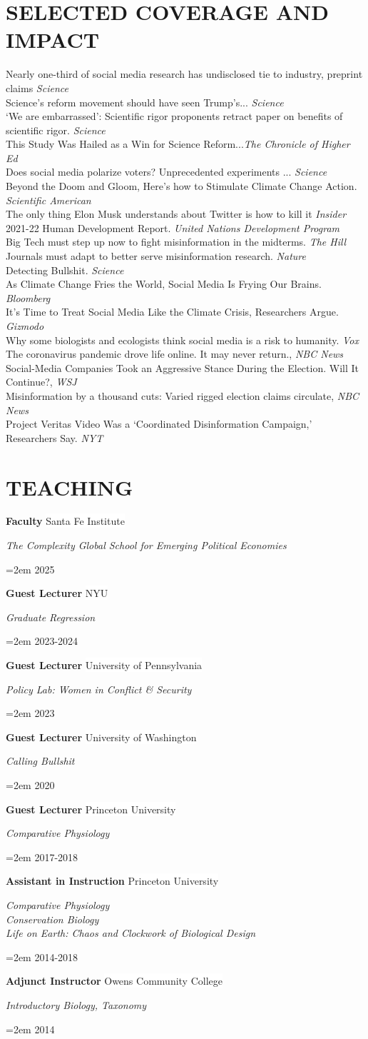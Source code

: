 \documentclass[paper=a4,fontsize=11pt]{scrartcl}
\newcommand{\NewPart}[1]{\section*{\uppercase{#1}}}
\newcommand{\EducationEntry}[4]{
		\noindent \textbf{#1} \hfill 					%
		\colorbox{White}{%
			\parbox{10em}{%
			\hfill\color{Black}#2}} \par				%
		\noindent \textit{#3} \par					%
		\noindent\hangindent=2em\hangafter=0 \small #4 	%
		\normalsize \par}
\newcommand{\WorkEntry}[4]{						%
		\noindent \textbf{#1} \hfill 					%
		\colorbox{White}{\color{Black}#2} \par		%
		\noindent \textit{#3} \par					%
		\noindent\hangindent=2em\hangafter=0 \small #4 	%
		\normalsize \par}
\begin{document}
\NewPart{Selected Coverage and Impact}{}
Nearly one-third of social media research has undisclosed tie to industry, preprint claims \textit{Science}\\
Science’s reform movement should have seen Trump’s... \textit{Science}\\
‘We are embarrassed’: Scientific rigor proponents retract paper on benefits of scientific rigor. \textit{Science}\\
This Study Was Hailed as a Win for Science Reform...\textit{The Chronicle of Higher Ed}\\
Does social media polarize voters? Unprecedented experiments ... \textit{Science}\\
Beyond the Doom and Gloom, Here's how to Stimulate Climate Change Action. \textit{Scientific American}\\
The only thing Elon Musk understands about Twitter is how to kill it \textit{Insider}\\
2021-22 Human Development Report. \textit{United Nations Development Program}\\
Big Tech must step up now to fight misinformation in the midterms.  \textit{The Hill}\\
Journals must adapt to better serve misinformation research. \textit{Nature}\\
Detecting Bullshit. \textit{Science}\\
As Climate Change Fries the World, Social Media Is Frying Our Brains. \textit{Bloomberg}\\
It's Time to Treat Social Media Like the Climate Crisis, Researchers Argue. \textit{Gizmodo} \\
Why some biologists and ecologists think social media is a risk to humanity. \textit{Vox}\\
The coronavirus pandemic drove life online. It may never return., \textit{NBC News} \\
Social-Media Companies Took an Aggressive Stance During the Election. Will It Continue?, \textit{WSJ}\\
Misinformation by a thousand cuts: Varied rigged election claims circulate, \textit{NBC News}\\
Project Veritas Video Was a ‘Coordinated Disinformation Campaign,’ Researchers Say. \textit{NYT}

\NewPart{Teaching}{}
\WorkEntry{Faculty}{Santa Fe Institute}{The Complexity Global School for Emerging Political Economies}{2025}
\WorkEntry{Guest Lecturer}{NYU}{Graduate Regression}{2023-2024}
\WorkEntry{Guest Lecturer}{University of Pennsylvania}{Policy Lab: Women in Conflict \& Security}{2023}
\WorkEntry{Guest Lecturer}{University of Washington}{Calling Bullshit}{2020}
\WorkEntry{Guest Lecturer}{Princeton University}{Comparative Physiology}{2017-2018}
\WorkEntry{Assistant in Instruction}{Princeton University}{Comparative Physiology\\Conservation Biology \\ Life on Earth: Chaos and Clockwork of Biological Design}{2014-2018}
\WorkEntry{Adjunct Instructor}{Owens Community College}{Introductory Biology, Taxonomy}{2014}
\end{document}
